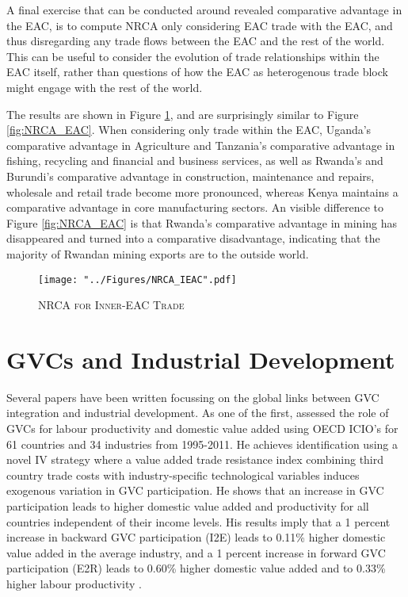\documentclass[a4paper]{article}
\begin{document}
A final exercise that can be conducted around revealed comparative advantage in the EAC, is to compute NRCA only considering EAC trade with the EAC, and thus disregarding any trade flows between the EAC and the rest of the world. This can be useful to consider the evolution of trade relationships within the EAC itself, rather than questions of how the EAC as heterogenous trade block might engage with the rest of the world.  \newline

The results are shown in Figure \ref{fig:NRCA_IEAC}, and are surprisingly similar to Figure \ref{fig:NRCA_EAC}. When considering only trade within the EAC, Uganda's comparative advantage in Agriculture and Tanzania's comparative advantage in fishing, recycling and financial and business services, as well as Rwanda's and Burundi's comparative advantage in construction, maintenance and repairs, wholesale and retail trade become more pronounced, whereas Kenya maintains a comparative advantage in core manufacturing sectors.  An visible difference to Figure \ref{fig:NRCA_EAC} is that Rwanda's comparative advantage in mining has disappeared and turned into a comparative disadvantage, indicating that the majority of Rwandan mining exports are to the outside world. 

\begin{figure}[h!]
\centering
\caption{\label{fig:NRCA_IEAC}\textsc{NRCA for Inner-EAC Trade}}
\texttt{[image: "../Figures/NRCA\_IEAC".pdf]} %
\end{figure}
\FloatBarrier


\section{GVCs and Industrial Development}
Several papers have been written focussing on the global links between GVC integration and industrial development. As one of the first, \citet{Kummritz20161} assessed the role of GVCs for labour productivity and domestic value added using OECD ICIO's for 61 countries and 34 industries from 1995-2011. He achieves identification using a novel IV strategy where a value added trade resistance index combining third country trade costs with industry-specific technological variables induces exogenous variation in GVC participation. He shows that an increase in GVC participation leads to higher domestic value added and productivity for all countries independent of their income levels. His results imply that a 1 percent increase in backward GVC participation (I2E) leads to 0.11\% higher domestic value added in the average industry, and  a 1 percent increase in forward GVC participation (E2R) leads to 0.60\% higher domestic value added and to 0.33\% higher labour productivity \citep{Kummritz20161}. \newline
\end{document}
